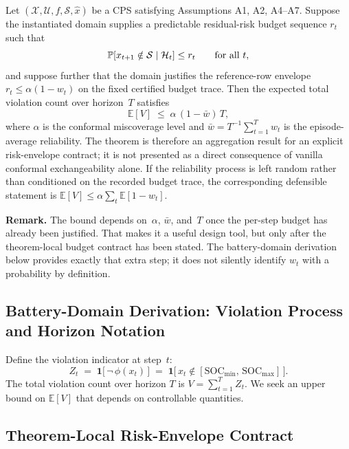 \begin{theorem}
\label{thm:core-bound-general}
Let $(\mathcal{X}, \mathcal{U}, f, \mathcal{S}, \hat{x})$ be a CPS
satisfying Assumptions A1, A2, A4--A7.  Suppose the instantiated domain
supplies a predictable residual-risk budget sequence $r_t$ such that
\[
  \operatorname{\mathbb{P}}[x_{t+1}\notin\mathcal{S}\mid\mathcal{H}_t] \le r_t
  \qquad\text{for all } t,
\]
and suppose further that the domain justifies the reference-row envelope
$r_t \le \alpha(1-w_t)$ on the fixed certified budget trace.  Then the expected
total violation count over horizon~$T$ satisfies
\[
  \mathbb{E}[V] \;\le\; \alpha\,(1 - \bar{w})\,T,
\]
where $\alpha$ is the conformal miscoverage level and
$\bar{w} = T^{-1}\sum_{t=1}^T w_t$ is the episode-average reliability.
The theorem is therefore an aggregation result for an explicit risk-envelope
contract; it is not presented as a direct consequence of vanilla conformal
exchangeability alone.
If the reliability process is left random rather than conditioned on the
recorded budget trace, the corresponding defensible statement is
$\mathbb{E}[V]\le\alpha\sum_t\mathbb{E}[1-w_t]$.
\end{theorem}

\noindent\textbf{Remark.}  The bound depends on~$\alpha$, $\bar{w}$, and~$T$
once the per-step budget has already been justified.  That makes it a useful
design tool, but only after the theorem-local budget contract has been stated.
The battery-domain derivation below provides exactly that extra step; it does
not silently identify $w_t$ with a probability by definition.

\subsection{Battery-Domain Derivation: Violation Process and Horizon Notation}


Define the violation indicator at step~$t$:
\[
  Z_t \;=\; \mathbf{1}\!\bigl[\,\lnot\,\phi(x_t)\,\bigr]
  \;=\; \mathbf{1}\!\bigl[\,x_t \notin
  [\text{SOC}_{\min},\, \text{SOC}_{\max}]\,\bigr].
\]
The total violation count over horizon $T$ is $V = \sum_{t=1}^T Z_t$.
We seek an upper bound on $\mathbb{E}[V]$ that depends on controllable
quantities.

\subsection{Theorem-Local Risk-Envelope Contract}

